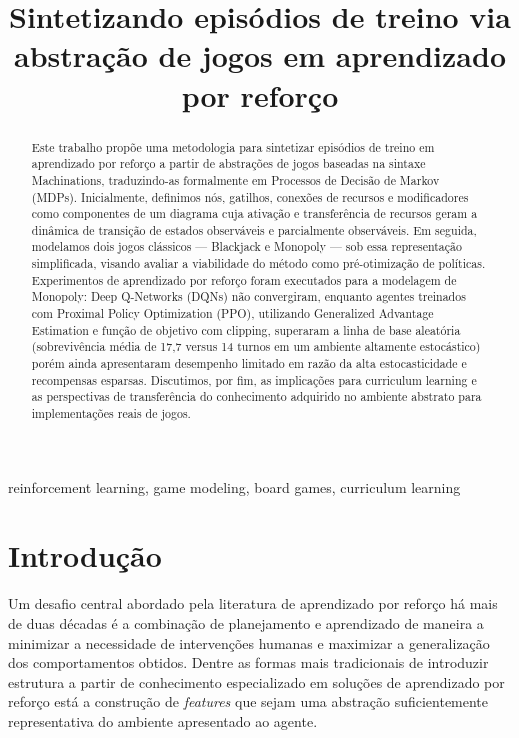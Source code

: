 \documentclass[conference]{IEEEtran}
\begin{document}

\title{Sintetizando episódios de treino via abstração de jogos em aprendizado por reforço}

\author{
}

\maketitle

\begin{abstract}
    \space Este trabalho propõe uma metodologia para sintetizar episódios de treino em aprendizado por reforço a partir de abstrações de jogos baseadas na sintaxe Machinations, traduzindo-as formalmente em Processos de Decisão de Markov (MDPs). Inicialmente, definimos nós, gatilhos, conexões de recursos e modificadores como componentes de um diagrama cuja ativação e transferência de recursos geram a dinâmica de transição de estados observáveis e parcialmente observáveis. Em seguida, modelamos dois jogos clássicos — Blackjack e Monopoly — sob essa representação simplificada, visando avaliar a viabilidade do método como pré-otimização de políticas. Experimentos de aprendizado por reforço foram executados para a modelagem de Monopoly: Deep Q-Networks (DQNs) não convergiram, enquanto agentes treinados com Proximal Policy Optimization (PPO), utilizando Generalized Advantage Estimation e função de objetivo com clipping, superaram a linha de base aleatória (sobrevivência média de 17,7 versus 14 turnos em um ambiente altamente estocástico) porém ainda apresentaram desempenho limitado em razão da alta estocasticidade e recompensas esparsas. Discutimos, por fim, as implicações para curriculum learning e as perspectivas de transferência do conhecimento adquirido no ambiente abstrato para implementações reais de jogos.
\end{abstract}

\begin{IEEEkeywords}
    \space reinforcement learning, game modeling, board games, curriculum learning
\end{IEEEkeywords}

\section{Introdução}
\label{intro}
Um desafio central abordado pela literatura de aprendizado por reforço há mais de duas décadas é a combinação de planejamento e aprendizado de maneira a minimizar a necessidade de intervenções humanas e maximizar a generalização dos comportamentos obtidos. Dentre as formas mais tradicionais de introduzir estrutura a partir de conhecimento especializado em soluções de aprendizado por reforço está a construção de \textit{features} que sejam uma abstração suficientemente representativa do ambiente apresentado ao agente. 
\end{document}
